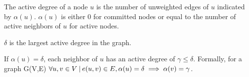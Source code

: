\begin{ldef}
The active degree of a node $u$ is the number of unweighted edges of $u$ indicated by $\alpha(u)$. $\alpha(u)$ is either 0 for committed nodes or equal to the number of active neighbors of $u$ for active nodes.
\end{ldef}
\begin{ldef}
$\delta$ is the largest active degree in the graph.
\end{ldef}
\begin{ldef}
If $\alpha(u) = \delta$, each neighbor of $u$ has an active degree of $\gamma \le \delta$. Formally, for a graph G(V,E) $\forall u,v \in V {\: |\:} e(u,v) \in E, \alpha(u) = \delta \implies \alpha (v) = \gamma$.
\end{ldef}

